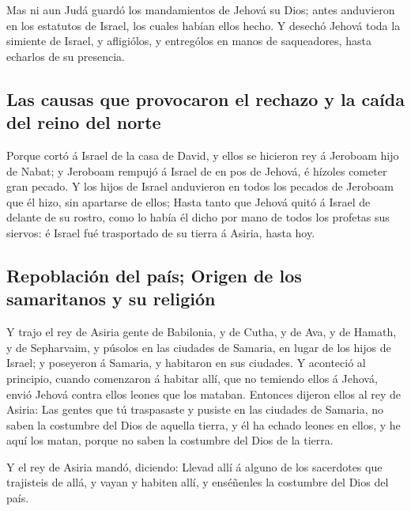  Mas ni aun Judá guardó los mandamientos de Jehová su
Dios; antes anduvieron en los estatutos de Israel, los cuales habían
ellos hecho.  Y desechó Jehová toda la simiente de
Israel, y afligiólos, y entrególos en manos de saqueadores, hasta
echarlos de su presencia.

\hypertarget{las-causas-que-provocaron-el-rechazo-y-la-cauxedda-del-reino-del-norte}{%
\subsection{Las causas que provocaron el rechazo y la caída del reino
del
norte}\label{las-causas-que-provocaron-el-rechazo-y-la-cauxedda-del-reino-del-norte}}

 Porque cortó á Israel de la casa de David, y ellos se
hicieron rey á Jeroboam hijo de Nabat; y Jeroboam rempujó á Israel de en
pos de Jehová, é hízoles cometer gran pecado.  Y los
hijos de Israel anduvieron en todos los pecados de Jeroboam que él hizo,
sin apartarse de ellos;  Hasta tanto que Jehová quitó á
Israel de delante de su rostro, como lo había él dicho por mano de todos
los profetas sus siervos: é Israel fué trasportado de su tierra á
Asiria, hasta hoy.

\hypertarget{repoblaciuxf3n-del-pauxeds-origen-de-los-samaritanos-y-su-religiuxf3n}{%
\subsection{Repoblación del país; Origen de los samaritanos y su
religión}\label{repoblaciuxf3n-del-pauxeds-origen-de-los-samaritanos-y-su-religiuxf3n}}

 Y trajo el rey de Asiria gente de Babilonia, y de Cutha,
y de Ava, y de Hamath, y de Sepharvaim, y púsolos en las ciudades de
Samaria, en lugar de los hijos de Israel; y poseyeron á Samaria, y
habitaron en sus ciudades.  Y aconteció al principio,
cuando comenzaron á habitar allí, que no temiendo ellos á Jehová, envió
Jehová contra ellos leones que los mataban.  Entonces
dijeron ellos al rey de Asiria: Las gentes que tú traspasaste y pusiste
en las ciudades de Samaria, no saben la costumbre del Dios de aquella
tierra, y él ha echado leones en ellos, y he aquí los matan, porque no
saben la costumbre del Dios de la tierra.

 Y el rey de Asiria mandó, diciendo: Llevad allí á alguno
de los sacerdotes que trajisteis de allá, y vayan y habiten allí, y
enséñenles la costumbre del Dios del país.

